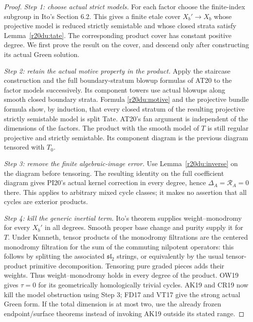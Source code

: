 \begin{proof}
\emph{Step 1: choose actual strict models.}
For each factor choose the finite-index subgroup in Ito's
Section 6.2.  This gives a finite etale cover $X_b'\to X_b$
whose projective model is reduced strictly semistable and whose
closed strata satisfy Lemma~\ref{r20du:tate}.  The corresponding
product cover has constant positive degree.  We first prove the
result on the cover, and descend only after constructing its
actual Green solution.

\emph{Step 2: retain the actual motive property in the product.}
Apply the staircase construction and the full boundary-stratum
blowup formulas of AT20 to the factor models successively.
Its component towers use actual blowups along smooth closed
boundary strata.  Formula \eqref{r20du:motive} and the projective
bundle formula show, by induction, that every closed stratum of
the resulting projective strictly semistable model is split
Tate.  AT20's fan argument is independent of the dimensions of
the factors.  The product with the smooth model of $T$ is still
regular projective and strictly semistable.  Its component
diagram is the previous diagram tensored with $T_0$.

\emph{Step 3: remove the finite algebraic-image error.}
Use Lemma~\ref{r20du:inverse} on the diagram before tensoring.
The resulting identity on the full coefficient diagram gives
PI20's actual kernel correction in every degree, hence
$\Delta_A=\mathscr R_A=0$ there.  This applies to arbitrary
mixed cycle classes; it makes no assertion that all cycles are
exterior products.

\emph{Step 4: kill the generic inertial term.}
Ito's theorem supplies weight--monodromy for every $X_b'$ in
all degrees.  Smooth proper base change and purity supply it
for $T$.  Under Kunneth, tensor products of the monodromy
filtrations are the centered monodromy filtration for the sum
of the commuting nilpotent operators: this follows by splitting
the associated $\mathfrak{sl}_2$ strings, or equivalently by
the usual tensor-product primitive decomposition.  Tensoring
pure graded pieces adds their weights.  Thus weight--monodromy
holds in every degree of the product.  OW19 gives $\tau=0$
for its geometrically homologically trivial cycles.  AK19 and
CR19 now kill the model obstruction using Step 3; FD17 and
VT17 give the strong actual Green form.  If the total dimension
is at most two, use the already frozen endpoint/surface
theorems instead of invoking AK19 outside its stated range.


\end{proof}
